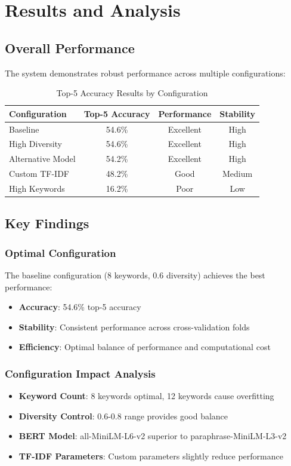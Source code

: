 \documentclass[12pt,a4paper]{article}
\begin{document}
\section{Results and Analysis}

\subsection{Overall Performance}
The system demonstrates robust performance across multiple configurations:

\begin{table}[H]
\centering
\caption{Top-5 Accuracy Results by Configuration}
\begin{tabular}{|l|c|c|c|}
\hline
\textbf{Configuration} & \textbf{Top-5 Accuracy} & \textbf{Performance} & \textbf{Stability} \\
\hline
Baseline & 54.6\% & Excellent & High \\
High Diversity & 54.6\% & Excellent & High \\
Alternative Model & 54.2\% & Excellent & High \\
Custom TF-IDF & 48.2\% & Good & Medium \\
High Keywords & 16.2\% & Poor & Low \\
\hline
\end{tabular}
\end{table}

\subsection{Key Findings}

\subsubsection{Optimal Configuration}
The baseline configuration (8 keywords, 0.6 diversity) achieves the best performance:
\begin{itemize}
    \item \textbf{Accuracy}: 54.6\% top-5 accuracy
    \item \textbf{Stability}: Consistent performance across cross-validation folds
    \item \textbf{Efficiency}: Optimal balance of performance and computational cost
\end{itemize}

\subsubsection{Configuration Impact Analysis}
\begin{itemize}
    \item \textbf{Keyword Count}: 8 keywords optimal, 12 keywords cause overfitting
    \item \textbf{Diversity Control}: 0.6-0.8 range provides good balance
    \item \textbf{BERT Model}: all-MiniLM-L6-v2 superior to paraphrase-MiniLM-L3-v2
    \item \textbf{TF-IDF Parameters}: Custom parameters slightly reduce performance
\end{itemize}
\end{document}
